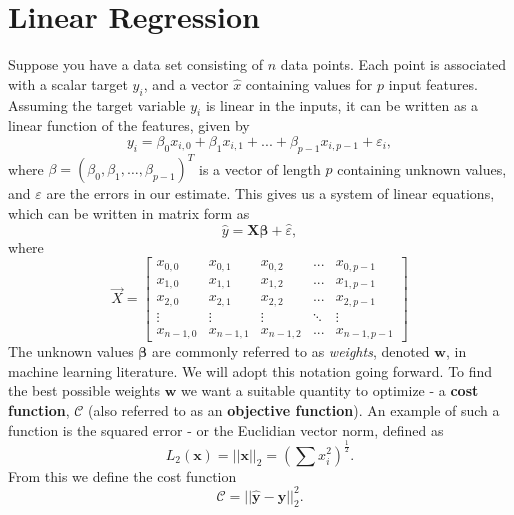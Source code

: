 \section{Linear Regression}\label{sec:linreg}
Suppose you have a data set consisting of $n$ data points. Each point is associated
with a scalar target $y_i$, and a vector $\hat{x}$ containing values for $p$ input
features. Assuming the target variable $y_i$ is linear in the inputs, it can be
written as a linear function of the features, given by
\begin{equation}\label{eq:ols-target}
y_i = \beta_0 x_{i,0} + \beta_1 x_{i,1} + ... + \beta_{p-1} x_{i, p-1} + \varepsilon_i,
\end{equation}
where $\beta = (\beta_0, \beta_1, \dots, \beta_{p-1})^T$ is a vector of length
$p$ containing unknown values, and $\varepsilon$ are the errors in our estimate.
This gives us a system of linear equations, which can be written in matrix form as
\begin{equation}\label{eq:ols-target-mat}
  \hat{y} = \boldsymbol{X\beta} + \hat{\varepsilon},
\end{equation}
where
\begin{equation}
\vec{X} = \left[
\begin{matrix}
x_{0,0} & x_{0,1} & x_{0,2} & ... & x_{0,p-1}\\
x_{1,0} & x_{1,1} & x_{1,2} & ... & x_{1,p-1}\\
x_{2,0} & x_{2,1} & x_{2,2} & ... & x_{2,p-1}\\
\vdots & \vdots & \vdots & \ddots & \vdots\\
x_{n-1,0} & x_{n-1,1} & x_{n-1,2} & ... & x_{n-1,p-1}
\end{matrix}
\right]
\end{equation}
The unknown values $\boldsymbol{\beta}$ are commonly referred to as \textit{weights}, denoted $\boldsymbol{w}$,
in machine learning literature. We will adopt this notation going forward.
To find the best possible weights $\boldsymbol{w}$ we want a suitable
quantity to optimize - a \textbf{cost function}, $\mathcal{C}$ (also referred to as an
\textbf{objective function}). An example of such a function is the squared error - or the Euclidian vector norm, defined as
\begin{equation}
	L_2(\boldsymbol{x}) =||\boldsymbol{x}||_2 = \left(\sum x_i^2\right)^{\frac{1}{2}}.
\end{equation}
From this we define the cost function
\begin{equation}
	\mathcal{C} = || \boldsymbol{\hat{y}} - \boldsymbol{y} ||_2 ^2.
\end{equation}
